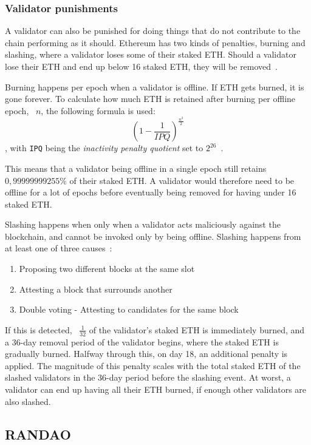 \subsubsection{Validator punishments}\label{subsubsec:valpunish}
A validator can also be punished for doing things that do not contribute to the chain performing as it should.
Ethereum has two kinds of penalties, burning and slashing, where a validator loses some of their staked ETH\@.
Should a validator lose their ETH and end up below 16 staked ETH, they will be removed~\cite{consensus-spec-phase-0}.


Burning happens per epoch when a validator is offline.
If ETH gets burned, it is gone forever.
To calculate how much ETH is retained after burning per offline epoch, ~$n$, the following formula is used:
\begin{equation}
    \left(1-\frac{1}{IPQ}\right)^\frac{n^2}{2}
    \label{eq:burn}
\end{equation},
with \texttt{IPQ} being the \textit{inactivity penalty quotient} set to $2^{26}$~\cite{consensus-spec-phase-0}.


This means that a validator being offline in a single epoch still retains $0,99999999255\%$ of their staked ETH\@.
A validator would therefore need
to be offline for a lot of epochs before eventually being removed for having under 16 staked ETH\@.


Slashing happens when only when a validator acts maliciously against the blockchain,
and cannot be invoked only by being offline.
Slashing happens from at least one of three causes~\cite{PoSRewAndPen}:
\begin{enumerate}
    \item Proposing two different blocks at the same slot
    \item Attesting a block that surrounds another
    \item Double voting - Attesting to candidates for the same block
\end{enumerate}
If this is detected, ~$\frac{1}{32}$ of the validator's staked ETH is immediately burned,
and a 36-day removal period of the validator begins, where the staked ETH is gradually burned.
Halfway through this, on day 18, an additional penalty is applied.
The magnitude of this penalty scales with the total staked ETH of the slashed validators in the 36-day period before the slashing event.
At worst, a validator can end up having all their ETH burned, if enough other validators are also slashed.

\subsection{RANDAO}\label{subsec:randao}

